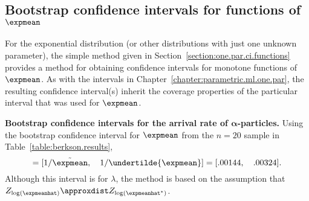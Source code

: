 \subsection{Bootstrap confidence 
intervals for functions of $\expmean$} For the exponential
distribution (or other distributions with just one unknown parameter),
the simple method given in Section~\ref{section:one.par.ci.functions}
provides a method for obtaining confidence intervals for monotone functions of
$\expmean$.  As with the intervals in 
Chapter~\ref{chapter:parametric.ml.one.par}, 
the resulting confidence interval(s) inherit the
coverage properties of the particular interval that was used for
$\expmean$.
\begin{example} 
{\bf Bootstrap confidence intervals for the arrival rate of
$\boldsymbol{\alpha}$-particles.} Using the bootstrap confidence interval for
$\boldsymbol{\expmean}$ from the $n=20$ sample in
Table~\ref{table:berkson.results},
\begin{displaymath}
 [ \undertilde{\lambda}, \quad  \tilde{\lambda} ] = 
 [1/ \tilde{\expmean}, \quad  1/ \undertilde{\expmean} ] =  [.00144,
\quad  .00324].
\end{displaymath}
Although this interval is for $\lambda$, the method
is based on the assumption that $Z_{\log(\expmeanhat)} \approxdist
Z_{\log(\expmeanhat^{*})}$.
\end{example}



